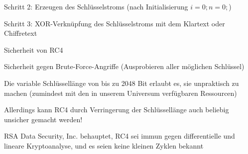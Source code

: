 \documentclass[a4paper]{article}
\begin{document}
\begin{multicols}{3}
\begin{itemize*}
\begin{itemize*}
                  \item Schritt 2: Erzeugen des Schlüsselstroms (nach Initialisierung $i = 0; n = 0;$)
                  \item Schritt 3: XOR-Verknüpfung des Schlüsselstroms mit dem Klartext oder Chiffretext
            \end{itemize*}
            \item Sicherheit von RC4
            \begin{itemize*}
                  \item Sicherheit gegen Brute-Force-Angriffe (Ausprobieren aller möglichen Schlüssel)
                  \begin{itemize*} \item Die variable Schlüssellänge von bis zu 2048 Bit erlaubt es, sie unpraktisch zu machen (zumindest mit den in unserem Universum verfügbaren Ressourcen) \item Allerdings kann RC4 durch Verringerung der Schlüssellänge auch beliebig unsicher gemacht werden! \end{itemize*}
                  \item RSA Data Security, Inc. behauptet, RC4 sei immun gegen differentielle und lineare Kryptoanalyse, und es seien keine kleinen Zyklen bekannt

\end{itemize*}
\end{itemize*}
\end{multicols}
\end{document}
